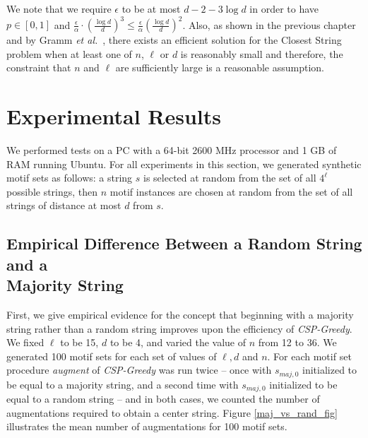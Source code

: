 We note that we require $\epsilon$ to be at most $d - 2 - 3 \log d$ in order to have $p \in [0, 1]$ and $\frac{\epsilon}{\alpha} \cdot \left( \frac{\log d}{d} \right)^3 \leq \frac{\epsilon}{\alpha} \left( \frac{\log d}{d} \right)^2$. Also, as shown in the previous chapter and by Gramm {\em et al.}\ \cite{GNR01}, there exists an efficient solution for the {\sc Closest String} problem when at least one of $n$, $\ell$ or $d$ is reasonably small and therefore, the constraint that $n$ and $\ell$ are sufficiently large is a reasonable assumption. 


\section{Experimental Results} \label{section:exp_results}

We performed tests on a PC with a 64-bit 2600 MHz processor and 1 GB of RAM running Ubuntu.  For all experiments in this section, we generated synthetic motif sets as follows: a string $s$ is selected at random from the set of all $4^{\ell}$ possible strings, then $n$ motif instances are chosen at random from the set of all strings of distance at most $d$ from $s$.

\subsection{Empirical Difference Between a Random String and a \\ Majority String} \label{sec:cspgreedy_vs_fpt}

First, we give empirical evidence for the concept that beginning with a majority string rather than a random string improves upon the efficiency of {\em CSP-Greedy}.  We fixed $\ell$ to be 15, $d$ to be 4, and varied the value of $n$ from 12 to 36.  We generated 100 motif sets for each set of values of $\ell, d$ and $n$.  For each motif set procedure {\em augment} of {\em CSP-Greedy} was run twice -- once with $s_{maj, 0}$ initialized to be equal to a majority string, and a second time with $s_{maj, 0}$ initialized to be equal to a random string -- and in both cases, we counted the number of augmentations required to obtain a center string. Figure \ref{maj_vs_rand_fig} illustrates the mean number of augmentations for 100 motif sets.  

